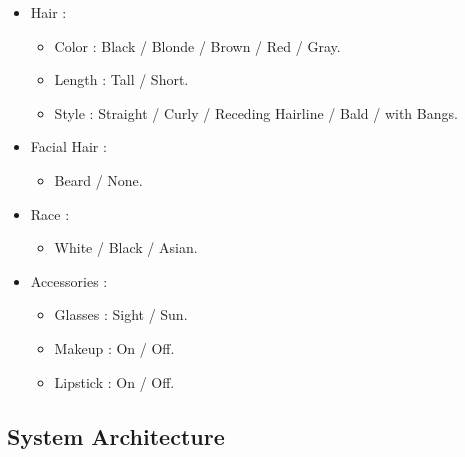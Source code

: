 \begin{itemize}
\begin{itemize}
    \end{itemize}
    \item Hair :
    \begin{itemize}
        \item Color : Black / Blonde / Brown / Red / Gray.
        \item Length : Tall / Short.
        \item Style : Straight / Curly / Receding Hairline / Bald / with Bangs.
    \end{itemize}
    \item Facial Hair :
    \begin{itemize}
        \item Beard / None.
    \end{itemize}
    \item Race :
    \begin{itemize}
        \item White / Black / Asian.
    \end{itemize}
    \item Accessories :
    \begin{itemize}
        \item Glasses : Sight / Sun.
        \item Makeup : On / Off.
        \item Lipstick : On / Off.
    \end{itemize}
\end{itemize}

\newpage

\subsection{System Architecture}

